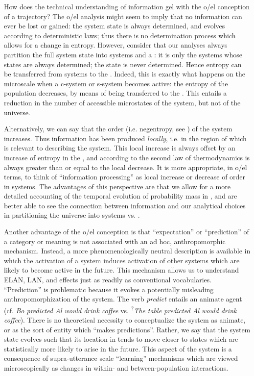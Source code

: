 How does the technical understanding of information gel with the o/el conception of a  trajectory? The o/el analysis might seem to imply that no information can ever be lost or gained: the system state is always determined, and evolves according to deterministic laws; thus there is no determination process which allows for a change in entropy. However, consider that our analyses always partition the full system state into systems and a : it is only the systems whose states are always determined; the  state is never determined. Hence entropy can be transferred from systems to the . Indeed, this is exactly what happens on the microscale when a c-system or s-system becomes active: the entropy of the population decreases, by means of being transferred to the . This entails a reduction in the number of accessible microstates of the system, but not of the universe.

Alternatively, we can say that the order (i.e. negentropy, see \citealt{Schrödinger1944}) of the system increases. Thus information has been produced \textit{locally}, i.e. in the region of  which is relevant to describing the system. This local increase is always offset by an increase of entropy in the , and according to the second law of thermodynamics is always greater than or equal to the local decrease. It is more appropriate, in o/el terms, to think of “information processing” as local increase or decrease of order in systems. The advantages of this perspective are that we allow for a more detailed accounting of the temporal evolution of probability mass in , and are better able to see the connection between information and our analytical choices in partitioning the universe into systems vs. . 

Another advantage of the o/el conception is that “expectation” or “prediction” of a category or meaning is not associated with an ad hoc, anthropomorphic mechanism. Instead, a more phenomenologically neutral description is available in which the activation of a system induces activation of other systems which are likely to become active in the future. This mechanism allows us to understand ELAN, LAN, and  effects just as readily as conventional vocabularies. “Prediction” is problematic because it evokes a potentially misleading anthropomorphization of the system. The verb \textit{predict} entails an animate agent (cf. \textit{Bo predicted Al would drink coffee} vs. \textsuperscript{?}\textit{The table predicted Al would drink coffee}). There is no theoretical necessity to conceptualize the system as animate, or as the sort of entity which “makes predictions”. Rather, we say that the system state evolves such that its location in  tends to move closer to states which are statistically more likely to arise in the future. This aspect of the system is a consequence of supra-utterance scale “learning” mechanisms which are viewed microscopically as changes in within- and between-population interactions.

